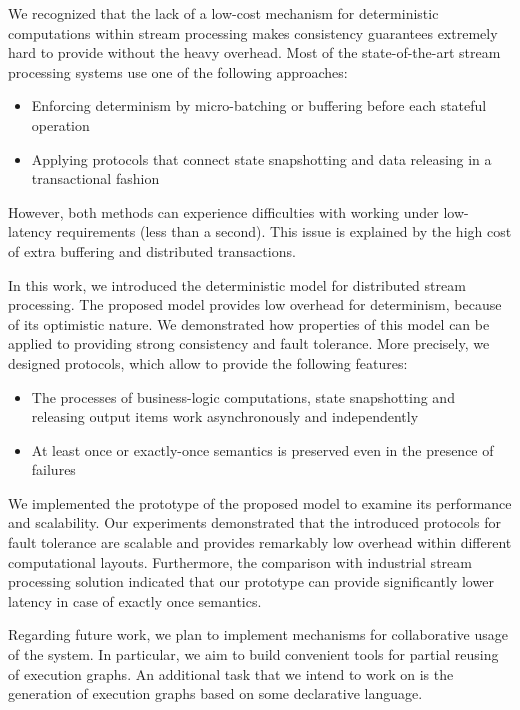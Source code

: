 
\label {fs-conclusion-seciton}

We recognized that the lack of a low-cost mechanism for deterministic computations within stream processing makes consistency guarantees extremely hard to provide without the heavy overhead. Most of the state-of-the-art stream processing systems use one of the following approaches: 
\begin{itemize}
    \item Enforcing determinism by micro-batching or buffering before each stateful operation
    \item Applying protocols that connect state snapshotting and data releasing in a transactional fashion
\end{itemize}

However, both methods can experience difficulties with working under low-latency requirements (less than a second). This issue is explained by the high cost of extra buffering and distributed transactions.

In this work, we introduced the deterministic model for distributed stream processing. The proposed model provides low overhead for determinism, because of its optimistic nature. We demonstrated how properties of this model can be applied to providing strong consistency and fault tolerance. More precisely, we designed protocols, which allow to provide the following features:

\begin{itemize}
    \item The processes of business-logic computations, state snapshotting and releasing output items work asynchronously and independently
    \item At least once or exactly-once semantics is preserved even in the presence of failures
\end{itemize}

We implemented the prototype of the proposed model to examine its performance and scalability. Our experiments demonstrated that the introduced protocols for fault tolerance are scalable and provides remarkably low overhead within different computational layouts. Furthermore, the comparison with industrial stream processing solution indicated that our prototype can provide significantly lower latency in case of exactly once semantics.

Regarding future work, we plan to implement mechanisms for collaborative usage of the system. In particular, we aim to build convenient tools for partial reusing of execution graphs. An additional task that we intend to work on is the generation of execution graphs based on some declarative language.
